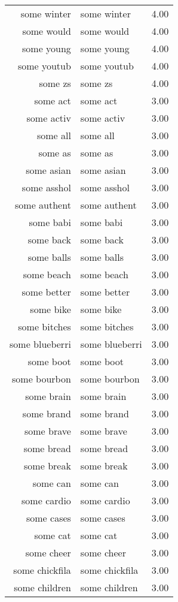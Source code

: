 \begin{table}[ht]
\begin{tabular}{rlr}
  some winter & some winter & 4.00 \\ 
  some would & some would & 4.00 \\ 
  some young & some young & 4.00 \\ 
  some youtub & some youtub & 4.00 \\ 
  some zs & some zs & 4.00 \\ 
  some act & some act & 3.00 \\ 
  some activ & some activ & 3.00 \\ 
  some all & some all & 3.00 \\ 
  some as & some as & 3.00 \\ 
  some asian & some asian & 3.00 \\ 
  some asshol & some asshol & 3.00 \\ 
  some authent & some authent & 3.00 \\ 
  some babi & some babi & 3.00 \\ 
  some back & some back & 3.00 \\ 
  some balls & some balls & 3.00 \\ 
  some beach & some beach & 3.00 \\ 
  some better & some better & 3.00 \\ 
  some bike & some bike & 3.00 \\ 
  some bitches & some bitches & 3.00 \\ 
  some blueberri & some blueberri & 3.00 \\ 
  some boot & some boot & 3.00 \\ 
  some bourbon & some bourbon & 3.00 \\ 
  some brain & some brain & 3.00 \\ 
  some brand & some brand & 3.00 \\ 
  some brave & some brave & 3.00 \\ 
  some bread & some bread & 3.00 \\ 
  some break & some break & 3.00 \\ 
  some can & some can & 3.00 \\ 
  some cardio & some cardio & 3.00 \\ 
  some cases & some cases & 3.00 \\ 
  some cat & some cat & 3.00 \\ 
  some cheer & some cheer & 3.00 \\ 
  some chickfila & some chickfila & 3.00 \\ 
  some children & some children & 3.00 \\ 

\end{tabular}
\end{table}

